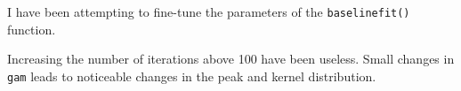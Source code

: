 I have been attempting to fine-tune the parameters of the \texttt{baselinefit()} function.

Increasing the number of iterations above 100 have been useless. Small changes in \texttt{gam} leads to noticeable changes in the peak and kernel distribution. 
